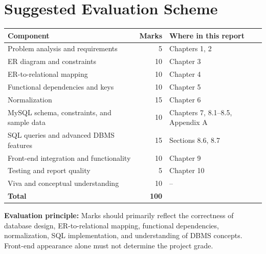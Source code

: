 \chapter*{Suggested Evaluation Scheme}
\begin{center}
\begin{tabular}{@{}lrl@{}}
\toprule
\textbf{Component} & \textbf{Marks} & \textbf{Where in this report} \\\midrule
Problem analysis and requirements & 5 & Chapters 1, 2 \\
ER diagram and constraints & 10 & Chapter 3 \\
ER-to-relational mapping & 10 & Chapter 4 \\
Functional dependencies and keys & 10 & Chapter 5 \\
Normalization & 15 & Chapter 6 \\
MySQL schema, constraints, and sample data & 10 & Chapters 7, 8.1--8.5, Appendix A \\
SQL queries and advanced DBMS features & 15 & Sections 8.6, 8.7 \\
Front-end integration and functionality & 10 & Chapter 9 \\
Testing and report quality & 5 & Chapter 10 \\
Viva and conceptual understanding & 10 & -- \\\midrule
\textbf{Total} & \textbf{100} & \\
\bottomrule
\end{tabular}
\end{center}
\textbf{Evaluation principle:} Marks should primarily reflect the correctness of database design, ER-to-relational
mapping, functional dependencies, normalization, SQL implementation, and understanding of DBMS concepts. Front-end
appearance alone must not determine the project grade.
